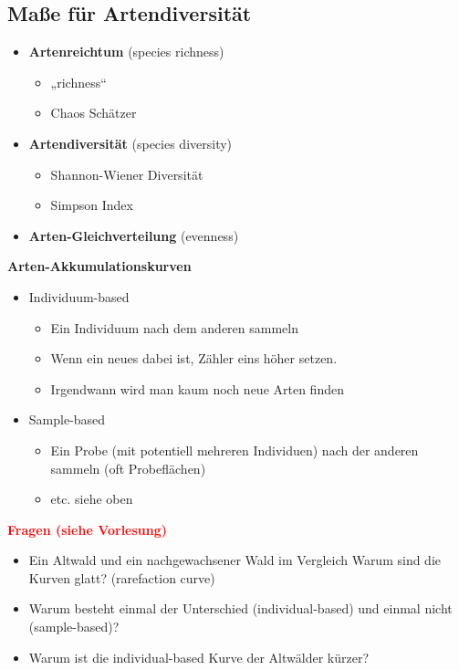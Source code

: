 \subsection{Maße für Artendiversität}
\begin{itemize}
	\item \textbf{Artenreichtum} (species richness)
	\begin{itemize}
		\item „richness“
		\item Chaos Schätzer
	\end{itemize}
	\item \textbf{Artendiversität} (species diversity)
	\begin{itemize}
		\item Shannon-Wiener Diversität
		\item Simpson Index
	\end{itemize}
	\item \textbf{Arten-Gleichverteilung} (evenness)
\end{itemize}

\newpage
\textbf{Arten-Akkumulationskurven}
\begin{itemize}
	\item Individuum-based
	\begin{itemize}
		\item Ein Individuum nach dem anderen sammeln
		\item Wenn ein neues dabei ist, Zähler eins höher setzen.
		\item Irgendwann wird man kaum noch neue Arten finden
	\end{itemize}
	\item Sample-based
	\begin{itemize}
		\item Ein Probe (mit potentiell mehreren Individuen) nach der anderen sammeln (oft Probeflächen)
		\item etc. siehe oben
	\end{itemize}
\end{itemize}

\textbf{\textcolor{red}{Fragen (siehe Vorlesung)}}
\begin{itemize}
	\item Ein Altwald und ein nachgewachsener Wald im Vergleich Warum sind die Kurven glatt? (rarefaction curve)
	\item Warum besteht einmal der Unterschied (individual-based) und einmal nicht (sample-based)?
	\item Warum ist die individual-based Kurve der Altwälder kürzer?
\end{itemize}